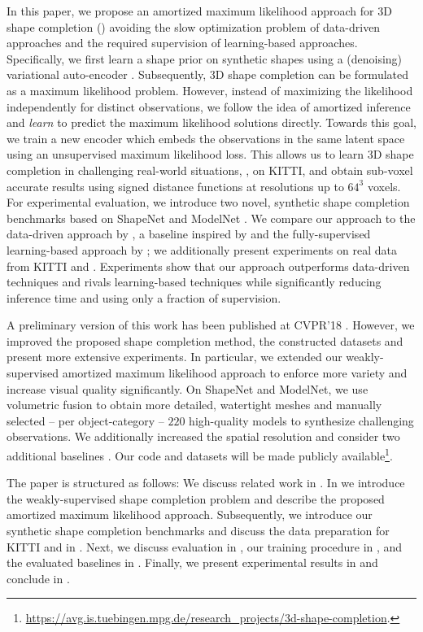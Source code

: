 In this paper, we propose an amortized maximum likelihood approach for 3D shape completion (\cf {}) avoiding the slow optimization problem of data-driven approaches and the required supervision of learning-based approaches. Specifically, we first learn a shape prior on synthetic shapes using a (denoising) variational auto-encoder \citep{Im2017AAAI,Kingma2014ICLR}. Subsequently, 3D shape completion can be formulated as a maximum likelihood problem. However, instead of maximizing the likelihood independently for distinct observations, we follow the idea of amortized inference \citep{Gersham2014COGSCI} and \emph{learn} to predict the maximum likelihood solutions directly. Towards this goal, we train a new encoder which embeds the observations in the same latent space using an unsupervised maximum likelihood loss. This allows us to learn 3D shape completion in challenging real-world situations, \eg, on KITTI, and obtain sub-voxel accurate results using signed distance functions at resolutions up to $64^3$ voxels. For experimental evaluation, we introduce two novel, synthetic shape completion benchmarks based on ShapeNet and ModelNet \citep{Wu2015CVPR}. We compare our approach to the data-driven approach by \cite{Engelmann2016GCPR}, a baseline inspired by \cite{Gupta2015CVPR} and the fully-supervised learning-based approach by \cite{Dai2017CVPRa}; we additionally present experiments on real data from KITTI and \Kinect \citep{Yang2018ARXIVb}. Experiments show that our approach outperforms data-driven techniques and rivals learning-based techniques while significantly reducing inference time and using only a fraction of supervision.

A preliminary version of this work has been published at CVPR'18 \citep{Stutz2018CVPR}. However, we improved the proposed shape completion method, the constructed datasets and present more extensive experiments. In particular, we extended our weakly-supervised amortized maximum likelihood approach to enforce more variety and increase visual quality significantly. On ShapeNet and ModelNet, we use volumetric fusion to obtain more detailed, watertight meshes and manually selected -- per object-category -- $220$ high-quality models to synthesize challenging observations. We additionally increased the spatial resolution and consider two additional baselines \citep{Dai2017CVPRa,Gupta2015CVPR}. Our code and datasets will be made publicly available\footnote{\url{https://avg.is.tuebingen.mpg.de/research_projects/3d-shape-completion}.}.

The paper is structured as follows: We discuss related work in . In  we introduce the weakly-supervised shape completion problem and describe the proposed amortized maximum likelihood approach. Subsequently, we introduce our synthetic shape completion benchmarks and discuss the data preparation for KITTI and \Kinect in . Next, we discuss evaluation in , our training procedure in , and the evaluated baselines in . Finally, we present experimental results in  and conclude in .